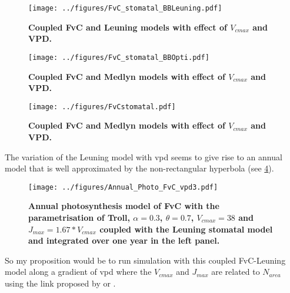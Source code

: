 \documentclass[a4paper,11pt]{article}
\begin{document}
\begin{figure}[ht]
\centering
\texttt{[image: ../figures/FvC\_stomatal\_BBLeuning.pdf]}
\caption{\textbf{Coupled FvC and Leuning models with effect of $V_{cmax}$ and VPD.}
\label{fig:photo_stomat_Leuning}}
\end{figure}

\begin{figure}[ht]
\centering
\texttt{[image: ../figures/FvC\_stomatal\_BBOpti.pdf]}
\caption{\textbf{Coupled FvC and Medlyn models with effect of $V_{cmax}$ and VPD.}
\label{fig:photo_stomat_opti}}
\end{figure}

\begin{figure}[ht]
\centering
\texttt{[image: ../figures/FvCstomatal.pdf]}
\caption{\textbf{Coupled FvC and Medlyn models with effect of $V_{cmax}$ and VPD.}
\label{fig:photo_stomat}}
\end{figure}


The variation of the Leuning model with vpd seems to give rise to an annual model that is well approximated by the non-rectangular hyperbola (see \ref{fig:photo_annu_fvc_vpd3}).

\begin{figure}[ht]
\centering
\texttt{[image: ../figures/Annual\_Photo\_FvC\_vpd3.pdf]}
\caption{\textbf{Annual photosynthesis model of FvC with the parametrisation of Troll, $\alpha = 0.3$, $\theta = 0.7$, $V_{cmax} = 38$ and $J_{max} = 1.67 * V_{cmax}$ coupled with the Leuning stomatal model and integrated over one year in the left panel.}
\label{fig:photo_annu_fvc_vpd3}}
\end{figure}


So my proposition would be to run simulation with this coupled FvC-Leuning model along a gradient of vpd where the $V_{cmax}$ and $J_{max}$ are related to $N_{area}$ using the link proposed by \citep{Kattge-2009} or \citep{Sakschewski-2015}. 







\end{document}
